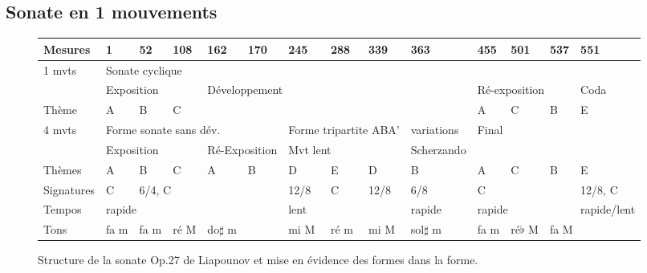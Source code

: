 \subsection{Sonate en 1 mouvements}

\begin{figure}[!p]
  \begin{bigcenter}
    \vspace{-1cm}
     {
\begin{tabular}{|l|l|l|l|l|l|l|l|l|l|l|l|l|l|}
 \hline
   Mesures & 1 & 52 & 108 & 162 & 170 & 245 & 288 & 339 & 363 & 455 & 501 & 537 & 551 \\
 \hline
 \hline
   1 mvts & \multicolumn{13}{|l|}{Sonate cyclique}\\
 \hline
          & \multicolumn{3}{|l|}{Exposition} & \multicolumn{6}{l|}{Développement} & \multicolumn{3}{l|}{Ré-exposition} & Coda\\
 \hline
   Thème & A & B & C & \multicolumn{6}{l|}{} & A & C & B & E\\
 \hline
 \hline
   4 mvts & \multicolumn{5}{|l|}{Forme sonate sans dév.} & \multicolumn{3}{|l|}{Forme tripartite ABA'} & variations & \multicolumn{4}{|l|}{Final}\\
 \hline
          & \multicolumn{3}{|l|}{Exposition} & \multicolumn{2}{l|}{Ré-Exposition} & \multicolumn{3}{l|}{Mvt lent} & Scherzando & \multicolumn{4}{l|}{}\\
 \hline
  Thèmes & A & B & C & A & B & D & E & D & B & A & C & B & E\\
 \hline
 \hline
  Signatures & C & \multicolumn{4}{|l|}{6/4, C} & 12/8 & C & 12/8 & 6/8 & \multicolumn{3}{|l|}{C} & 12/8, C\\
 \hline
  Tempos & \multicolumn{5}{|l|}{rapide} & \multicolumn{3}{|l|}{lent} & rapide & \multicolumn{3}{|l|}{rapide} & rapide/lent\\
 \hline
  Tons & fa m & fa m & ré M & \multicolumn{2}{|l|}{do$\sharp$ m} & mi M & ré m & mi M & sol$\sharp$ m & fa m & ré$\flat$ M & \multicolumn{2}{|l|}{fa M}\\
 \hline
\end{tabular}
    }
  \end{bigcenter}
  \caption{\label{structure}Structure de la sonate Op.27 de Liapounov et mise en évidence des formes dans la forme.}
\end{figure}

